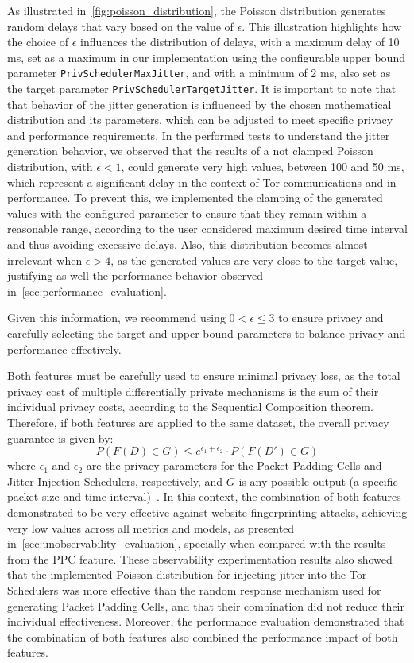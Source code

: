 As illustrated in~\autoref{fig:poisson_distribution}, the Poisson distribution generates random delays that vary based on the value of $\epsilon$. This illustration highlights how the choice of $\epsilon$ influences the distribution of delays, with a maximum delay of 10 ms, set as a maximum in our implementation using the configurable upper bound parameter \texttt{PrivSchedulerMaxJitter}, and with a minimum of 2 ms, also set as the target parameter \texttt{PrivSchedulerTargetJitter}. It is important to note that that behavior of the jitter generation is influenced by the chosen mathematical distribution and its parameters, which can be adjusted to meet specific privacy and performance requirements. In the performed tests to understand the jitter generation behavior, we observed that the results of a not clamped Poisson distribution, with $\epsilon < 1$, could generate very high values, between 100 and 50 ms, which represent a significant delay in the context of Tor communications and in performance. To prevent this, we implemented the clamping of the generated values with the configured parameter to ensure that they remain within a reasonable range, according to the user considered maximum desired time interval and thus avoiding excessive delays. Also, this distribution becomes almost irrelevant when $\epsilon > 4$, as the generated values are very close to the target value, justifying as well the performance behavior observed in~\autoref{sec:performance_evaluation}.

Given this information, we recommend using $0 < \epsilon \leq 3$ to ensure privacy and carefully selecting the target and upper bound parameters to balance privacy and performance effectively. 


Both features must be carefully used to ensure minimal privacy loss, as the total privacy cost of multiple differentially private mechanisms is the sum of their individual privacy costs, according to the Sequential Composition theorem. Therefore, if both features are applied to the same dataset, the overall privacy guarantee is given by:
\[P(F(D) \in G) \leq e^{\epsilon_1 + \epsilon_2} \cdot P(F(D') \in G)\]
where $\epsilon_1$ and $\epsilon_2$ are the privacy parameters for the Packet Padding Cells and Jitter Injection Schedulers, respectively, and $G$ is any possible output (a specific packet size and time interval)~\cite{DP_Book, AlgFoundationsDP}.
In this context, the combination of both features demonstrated to be very effective against website fingerprinting attacks, achieving very low values across all metrics and models, as presented in~\autoref{sec:unobservability_evaluation}, specially when compared with the results from the PPC feature.
These observability experimentation results also showed that the implemented Poisson distribution for injecting jitter into the Tor Schedulers was more effective than the random response mechanism used for generating Packet Padding Cells, and that their combination did not reduce their individual effectiveness.
Moreover, the performance evaluation demonstrated that the combination of both features also combined the performance impact of both features. 

